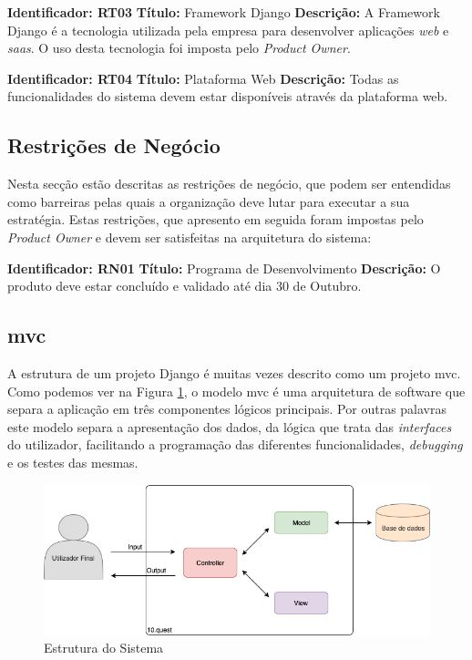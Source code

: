 \textbf{Identificador: RT03}
\newline
\textbf{Título:} Framework Django\cite{django}
\newline
\textbf{Descrição:} A Framework Django é a tecnologia utilizada pela empresa para desenvolver aplicações \textit{web} e \textit{\acrshort{saas}}. O uso desta tecnologia foi imposta pelo \textit{Product Owner}.

\textbf{Identificador: RT04}
\newline
\textbf{Título:} Plataforma Web
\newline
\textbf{Descrição:} Todas as funcionalidades do sistema devem estar disponíveis através da plataforma web.

\subsection{Restrições de Negócio}
Nesta secção estão descritas as restrições de negócio, que podem ser entendidas como barreiras pelas quais a organização deve lutar para executar a sua estratégia. Estas restrições, que apresento em seguida foram impostas pelo \textit{Product Owner} e devem ser satisfeitas na arquitetura do sistema:

\textbf{Identificador: RN01}
\newline
\textbf{Título:} Programa de Desenvolvimento
\newline
\textbf{Descrição:} O produto deve estar concluído e validado até dia 30 de Outubro.



\subsection{\acrfull{mvc}}

A estrutura de um projeto Django é muitas vezes descrito como um projeto \acrshort{mvc}. Como podemos ver na Figura \ref{fig:arq-mvc}, o modelo \acrshort{mvc} é uma arquitetura de software que separa a aplicação em três componentes lógicos principais. Por outras palavras este modelo separa a apresentação dos dados, da lógica que trata das \textit{interfaces} do utilizador, facilitando a programação das diferentes funcionalidades, \textit{debugging} e os testes das mesmas.

\begin{figure}[ht!]
	\begin{center}
		\includegraphics[width=1\textwidth]{img/arq/diagrama-MVC}
		\caption{Estrutura do Sistema}
		\label{fig:arq-mvc}
	\end{center}
\end{figure}

